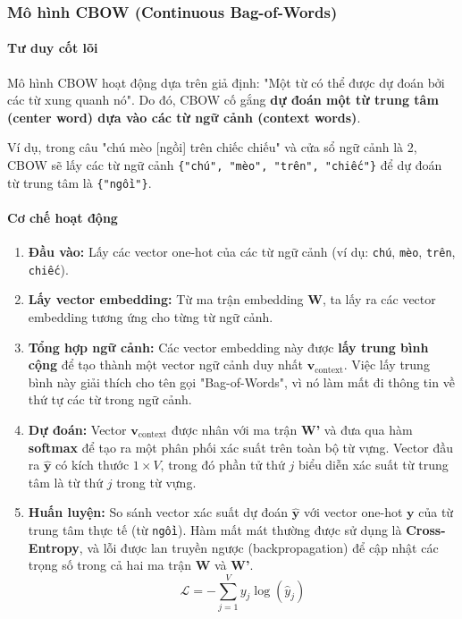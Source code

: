 \subsubsection{Mô hình CBOW (Continuous Bag-of-Words)}
\paragraph{Tư duy cốt lõi}
Mô hình CBOW hoạt động dựa trên giả định: "Một từ có thể được dự đoán bởi các từ xung quanh nó". Do đó, CBOW cố gắng \textbf{dự đoán một từ trung tâm (center word) dựa vào các từ ngữ cảnh (context words)}.

Ví dụ, trong câu "chú mèo [ngồi] trên chiếc chiếu" và cửa sổ ngữ cảnh là 2, CBOW sẽ lấy các từ ngữ cảnh \texttt{\{"chú", "mèo", "trên", "chiếc"\}} để dự đoán từ trung tâm là \texttt{\{"ngồi"\}}.

\paragraph{Cơ chế hoạt động}
\begin{enumerate}
    \item \textbf{Đầu vào:} Lấy các vector one-hot của các từ ngữ cảnh (ví dụ: \texttt{chú}, \texttt{mèo}, \texttt{trên}, \texttt{chiếc}).
    \item \textbf{Lấy vector embedding:} Từ ma trận embedding \textbf{W}, ta lấy ra các vector embedding tương ứng cho từng từ ngữ cảnh.
    \item \textbf{Tổng hợp ngữ cảnh:} Các vector embedding này được \textbf{lấy trung bình cộng} để tạo thành một vector ngữ cảnh duy nhất $\mathbf{v}_{\text{context}}$. Việc lấy trung bình này giải thích cho tên gọi "Bag-of-Words", vì nó làm mất đi thông tin về thứ tự các từ trong ngữ cảnh.
    \item \textbf{Dự đoán:} Vector $\mathbf{v}_{\text{context}}$ được nhân với ma trận \textbf{W'} và đưa qua hàm \textbf{softmax} để tạo ra một phân phối xác suất trên toàn bộ từ vựng. Vector đầu ra $\hat{\mathbf{y}}$ có kích thước $1 \times V$, trong đó phần tử thứ $j$ biểu diễn xác suất từ trung tâm là từ thứ $j$ trong từ vựng.
    \item \textbf{Huấn luyện:} So sánh vector xác suất dự đoán $\hat{\mathbf{y}}$ với vector one-hot $\mathbf{y}$ của từ trung tâm thực tế (từ \texttt{ngồi}). Hàm mất mát thường được sử dụng là \textbf{Cross-Entropy}, và lỗi được lan truyền ngược (backpropagation) để cập nhật các trọng số trong cả hai ma trận \textbf{W} và \textbf{W'}.
    $$ \mathcal{L} = -\sum_{j=1}^{V} y_j \log(\hat{y}_j) $$
\end{enumerate}

